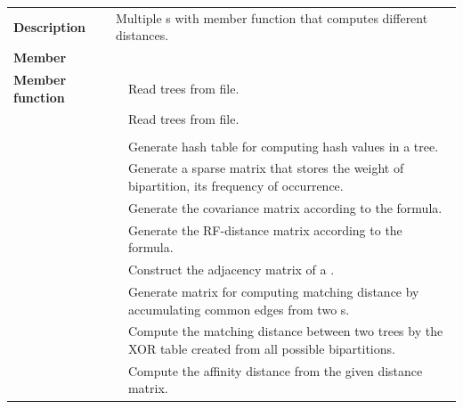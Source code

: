 \documentclass[11pt,a4paper]{article}
\newcommand{\myuline}[1]{%
	\uline{\phantom{#1}}%
	\llap{\contour{white}{#1}}%
}
\newcommand{\rref}[1]{\hyperref[#1]{\textcolor{blue}{\myuline{\texttt{#1}}}}}
\newcommand{\tref}[2]{\hyperref[#2]{\textcolor{blue}{\myuline{\texttt{#1}}}}}
\theoremstyle{definition}
\theoremstyle{definition}
\numberwithin{equation}{section}
\begin{document}
\begin{enumerate}
			\begin{tabular}{>{\bfseries}lp{0.3\textwidth}p{}}
				Description & \multicolumn{2}{p{0.6\textwidth}}{Multiple \rref{NEWICKTREE}s with member function that computes different distances.} \\
				Member &   & \\
				Member function & \rref{initialTrees} & Read trees from file. \\
				& \rref{ReadTrees} & Read trees from file. \\
				& \tref{compute\_numofbipart}{computenumofbipart} & \\
				& \tref{Compute\_Hash}{ComputeHash} & Generate hash table for computing hash values in a tree.\\
				& \tref{Compute\_Bipart\_Matrix}{ComputeBipartMatrix} & Generate a sparse matrix that stores the weight of bipartition, its frequency of occurrence.\\
				& \tref{Compute\_Bipart\_Covariance}{ComputeBipartCovariance} & Generate the covariance matrix according to the formula.\\
				& \tref{Compute\_RF\_dist\_by\_hash}{ComputeRFdistbyhash} & Generate the RF-distance matrix according to the formula.\\
				& \rref{pttree} & Construct the adjacency matrix of a \rref{Ptree}.\\
				& \tref{compute\_matrix}{computematrix} & Generate matrix for computing matching distance by accumulating common edges from two \rref{Ptree}s.\\
				& \tref{Compute\_Matching\_dist}{ComputeMatchingdist} & Compute the matching distance between two trees by the XOR table created from all possible bipartitions.\\ 
				& \tref{Compute\_Affinity\_dist}{ComputeAffinitydist} & Compute the affinity distance from the given distance matrix.\\
			\end{tabular}
	
		
	\end{enumerate}


	
\end{document}
